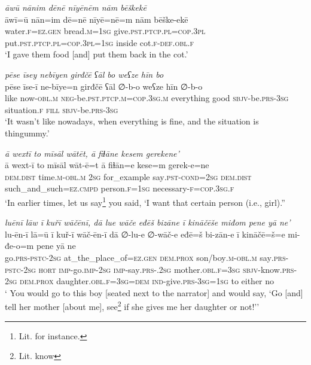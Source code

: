 \ea \label{ŽE.67}
\textit{āwū nānim dēnē nīyēnēm nām bēškekē} \\ 
\gll āwī=ū nān=im dē=nē nīyē=nē=m nām bēške-ekē \\ 
 water\textsc{.f}\textsc{\textsc{=ez.gen}} bread\textsc{.m}\textsc{=\textsc{1sg}} give\textsc{.pst}\textsc{.ptcp}\textsc{.pl}\textsc{=cop}\textsc{.3pl} put\textsc{.pst}\textsc{.ptcp}\textsc{.pl}\textsc{=cop}\textsc{.3pl}\textsc{=\textsc{1sg}} inside cot\textsc{.f}\textsc{-def}\textsc{.obl}\textsc{.f} \\ 
\glt `I gave them food [and] put them back in the cot.'
\z 
 
\ea \label{ŽE.72}
\textit{pēse īsey nebīyen girđčē ʕāl bo weʕze hīn bo} \\ 
\gll pēse īse-ī ne-bīye=n girđčē ʕāl ∅-b-o weʕze hīn ∅-b-o \\ 
  like now\textsc{-obl}\textsc{.m} \textsc{neg-}be\textsc{.pst}\textsc{.ptcp}\textsc{.m}\textsc{=cop}\textsc{.3sg}\textsc{.m} everything good \textsc{sbjv-}be\textsc{.prs}\textsc{-3sg} situation\textsc{.f} \textsc{fill} \textsc{sbjv-}be\textsc{.prs}\textsc{-3sg} \\ 
\glt `It wasn’t like nowadays, when everything is fine, and the situation is thingummy.'
\z 
 
\ea \label{ŽE.73}
\textit{ā wextī to mīsāl wātēt, ā fiɫāne kesem gerekene’} \\ 
\gll ā wext-ī to mīsāl wāt-ē=t ā fiɫān=e kese=m gerek-e=ne \\ 
 \textsc{dem.dist} time\textsc{.m}\textsc{-obl}\textsc{.m} \textsc{2sg} for\_example say\textsc{.pst}\textsc{-cond}\textsc{=\textsc{2sg}} \textsc{dem.dist} such\_and\_such\textsc{=ez}\textsc{.cmpd} person\textsc{.f}\textsc{=\textsc{1sg}} necessary\textsc{-f}\textsc{=cop}\textsc{.3sg}\textsc{.f} \\ 
\glt `In earlier times, let us say\footnote{Lit. for instance.} you said, ‘I want that certain person (i.e., girl).''
\z 
 
\ea \label{ŽE.74}
\textit{luēnī lāw ī kuřī wāčēnī, dā lue wāče eđēš bizāne ī kināčēše miđom pene yā ne’} \\ 
\gll lu-ēn-ī lā=ū ī kuř-ī wāč-ēn-ī dā ∅-lu-e ∅-wāč-e eđē=š bi-zān-e ī kināčē=š=e mi-đe-o=m pene yā ne \\ 
 go\textsc{.prs}\textsc{-pstc}-\textsc{2sg} at\_the\_place\_of\textsc{\textsc{=ez.gen}} \textsc{dem.prox} son/boy\textsc{.m}\textsc{-obl}\textsc{.m} say\textsc{.prs}\textsc{-pstc}-\textsc{2sg} \textsc{hort} \textsc{imp-}go.\textsc{imp-}\textsc{2sg} \textsc{imp-}say\textsc{.prs-}.\textsc{2sg} mother\textsc{.obl}\textsc{.f}\textsc{=3sg} \textsc{sbjv-}know\textsc{.prs}-\textsc{2sg} \textsc{dem.prox} daughter\textsc{.obl}\textsc{.f}\textsc{=3sg}\textsc{=dem} \textsc{ind-}give\textsc{.prs}\textsc{-3sg}\textsc{=\textsc{1sg}} to either no \\ 
\glt ` You would go to this boy [seated next to the narrator] and would say, ‘Go [and] tell her mother [about me], see\footnote{Lit. know} if she gives me her daughter or not!’'
\z 
 
